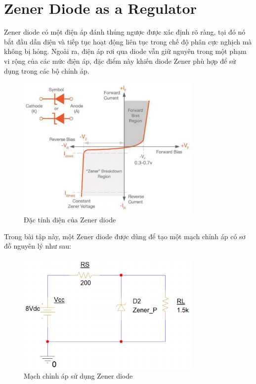 \section{Zener Diode as a Regulator}

Zener diode có một điện áp đánh thủng ngược được xác định rõ ràng, tại đó nó bắt đầu dẫn điện và tiếp tục hoạt động liên tục trong chế độ phân cực nghịch mà không bị hỏng. Ngoài ra, điện áp rơi qua diode vẫn giữ nguyên trong một phạm vi rộng của các mức điện áp, đặc điểm này khiến diode Zener phù hợp để sử dụng trong các bộ chỉnh áp.

\begin{figure}[H]
    \centering
    \includegraphics[width=0.8\textwidth]{graphics/ex8/f1.png}
    \caption{Đặc tính điện của Zener diode}
\end{figure}
\clearpage
Trong bài tập này, một Zener diode được dùng để tạo một mạch chỉnh áp có sơ đồ nguyên lý như sau:

\begin{figure}[H]
    \centering
    \includegraphics[width=0.8\textwidth]{graphics/ex8/f2.png}
    \caption{Mạch chỉnh áp sử dụng Zener diode}
\end{figure}

